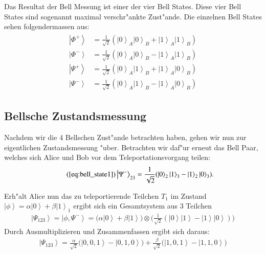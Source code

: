 \begin{refsection}
Das Resultat der Bell Messung ist einer der vier Bell States. Diese vier Bell States sind sogenannt maximal verschr"ankte Zust"ande. Die einzelnen Bell States sehen folgendermassen aus:
\begin{align}
	\begin{split}
\left|\Phi^+\right\rangle & = \frac{1}{\sqrt{2}}(\left|0\right\rangle_{A}\left|0\right\rangle_{B} + \left|1\right\rangle_{A}\left|1\right\rangle_{B}) \\
\left|\Phi^-\right\rangle & = \frac{1}{\sqrt{2}}(\left|0\right\rangle_{A}\left|0\right\rangle_{B} - \left|1\right\rangle_{A}\left|1\right\rangle_{B}) \\
\left|\Psi^+\right\rangle & = \frac{1}{\sqrt{2}}(\left|0\right\rangle_{A}\left|1\right\rangle_{B} + \left|1\right\rangle_{A}\left|0\right\rangle_{B}) \\
\left|\Psi^-\right\rangle & = \frac{1}{\sqrt{2}}(\left|0\right\rangle_{A}\left|1\right\rangle_{B} - \left|1\right\rangle_{A}\left|0\right\rangle_{B}) 
	\end{split}
\end{align}

\subsection{Bellsche Zustandsmessung}\label{sec:bell-measurement}
%

Nachdem wir die 4 Bellschen Zust"ande betrachten haben, gehen wir nun zur eigentlichen Zustandsmessung "uber. Betrachten wir daf"ur erneut das Bell Paar, welches sich Alice und Bob vor dem Teleportationsvorgang teilen:
\begin{align}  \tag{\ref{eq:bell_state1}}
 \left|\Psi^{-}\right\rangle_{23} = \frac{1}{\sqrt{2}} ( \left|0\right\rangle_{2}\left|1\right\rangle_{3} - \left|1\right\rangle_{2}\left|0\right\rangle_{3} ).
\end{align}

Erh"alt Alice nun das zu teleportierende Teilchen $T_{1}$ im Zustand $\left|\phi\right\rangle = \alpha\left|0\right\rangle + \beta\left|1\right\rangle_{1}$ ergibt sich ein Gesamtsystem aus 3 Teilchen
\begin{align}\label{eq:full_system1}
\left|\Psi_{123}\right\rangle = \left| \phi, \Psi^{-} \right\rangle = \big( \alpha \left| 0 \right\rangle + \beta \left| 1 \right\rangle \big) \otimes \big( \frac{1}{\sqrt{2}} ( \left|0\right\rangle \left|1\right\rangle - \left|1\right\rangle \left|0\right\rangle ) \big)
\end{align}
Durch Ausmultiplizieren und Zusammenfassen ergibt sich daraus:
\begin{align}\label{eq:full_system2}
\left|\Psi_{123}\right\rangle = \frac{\alpha}{\sqrt{2}} \big(\left|0, 0, 1 \right\rangle - \left|0, 1, 0 \right\rangle  \big) + \frac{\beta}{\sqrt{2}} \big(\left|1, 0, 1 \right\rangle - \left|1, 1, 0 \right\rangle \big)
\end{align}


\end{refsection}
